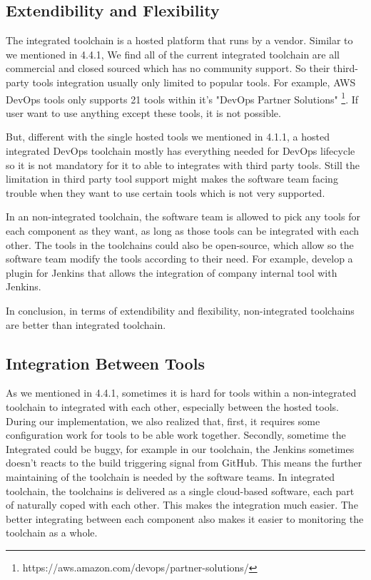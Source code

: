 \subsection{Extendibility and Flexibility}
The integrated toolchain is a hosted platform that runs by a vendor. Similar to we mentioned in 4.4.1, We find all of the current integrated toolchain are all commercial and closed sourced which has no community support. So their third-party tools integration usually only limited to popular tools. For example, AWS DevOps tools only supports 21 tools within it's "DevOps Partner Solutions" \footnote{https://aws.amazon.com/devops/partner-solutions/}. If user want to use anything except these tools, it is not possible.
\par
But, different with the single hosted tools we mentioned in 4.1.1, a hosted integrated DevOps toolchain mostly has everything needed for DevOps lifecycle so it is not mandatory for it to able to integrates with third party tools. Still the limitation in third party tool support might makes the software team facing trouble when they want to use certain tools which is not very supported.
\par
In an non-integrated toolchain, the software team is allowed to pick any tools for each component as they want, as long as those tools can be integrated with each other. The tools in the toolchains could also be open-source, which allow so the software team modify the tools according to their need. For example, develop a plugin for Jenkins that allows the integration of company internal tool with Jenkins.
\par
In conclusion, in terms of extendibility and flexibility, non-integrated toolchains are better than integrated toolchain.
\subsection{Integration Between Tools}
As we mentioned in 4.4.1, sometimes it is hard for tools within a non-integrated toolchain to integrated with each other, especially between the hosted tools. 
During our implementation, we also realized that, first, it requires some configuration work for tools to be able work together. Secondly, sometime the Integrated could be buggy, for example in our toolchain, the Jenkins sometimes doesn't reacts to the build triggering signal from GitHub. This means the further maintaining of the toolchain is needed by the software teams.
In integrated toolchain, the toolchains is delivered as a single cloud-based software, each part of naturally coped with each other. This makes the integration much easier.
The better integrating between each component also makes it easier to monitoring the toolchain as a whole.
